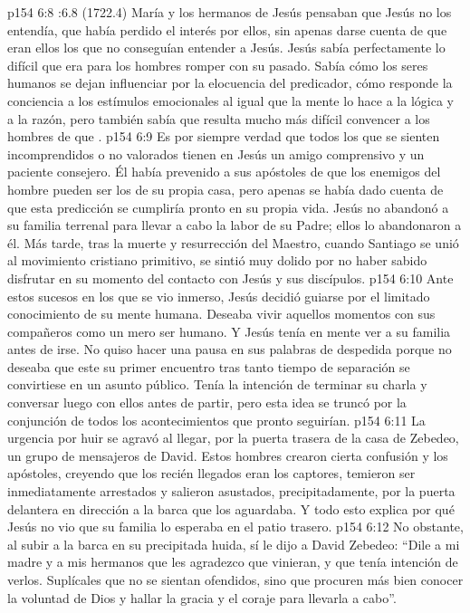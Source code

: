 \vs p154 6:8 :6.8 (1722.4) María y los hermanos de Jesús pensaban que Jesús no los entendía, que había perdido el interés por ellos, sin apenas darse cuenta de que eran ellos los que no conseguían entender a Jesús. Jesús sabía perfectamente lo difícil que era para los hombres romper con su pasado. Sabía cómo los seres humanos se dejan influenciar por la elocuencia del predicador, cómo responde la conciencia a los estímulos emocionales al igual que la mente lo hace a la lógica y a la razón, pero también sabía que resulta mucho más difícil convencer a los hombres de que .
\vs p154 6:9 Es por siempre verdad que todos los que se sienten incomprendidos o no valorados tienen en Jesús un amigo comprensivo y un paciente consejero. Él había prevenido a sus apóstoles de que los enemigos del hombre pueden ser los de su propia casa, pero apenas se había dado cuenta de que esta predicción se cumpliría pronto en su propia vida. Jesús no abandonó a su familia terrenal para llevar a cabo la labor de su Padre; ellos lo abandonaron a él. Más tarde, tras la muerte y resurrección del Maestro, cuando Santiago se unió al movimiento cristiano primitivo, se sintió muy dolido por no haber sabido disfrutar en su momento del contacto con Jesús y sus discípulos.
\vs p154 6:10 \pc Ante estos sucesos en los que se vio inmerso, Jesús decidió guiarse por el limitado conocimiento de su mente humana. Deseaba vivir aquellos momentos con sus compañeros como un mero ser humano. Y Jesús tenía en mente ver a su familia antes de irse. No quiso hacer una pausa en sus palabras de despedida porque no deseaba que este su primer encuentro tras tanto tiempo de separación se convirtiese en un asunto público. Tenía la intención de terminar su charla y conversar luego con ellos antes de partir, pero esta idea se truncó por la conjunción de todos los acontecimientos que pronto seguirían.
\vs p154 6:11 La urgencia por huir se agravó al llegar, por la puerta trasera de la casa de Zebedeo, un grupo de mensajeros de David. Estos hombres crearon cierta confusión y los apóstoles, creyendo que los recién llegados eran los captores, temieron ser inmediatamente arrestados y salieron asustados, precipitadamente, por la puerta delantera en dirección a la barca que los aguardaba. Y todo esto explica por qué Jesús no vio que su familia lo esperaba en el patio trasero.
\vs p154 6:12 No obstante, al subir a la barca en su precipitada huida, sí le dijo a David Zebedeo: “Dile a mi madre y a mis hermanos que les agradezco que vinieran, y que tenía intención de verlos. Suplícales que no se sientan ofendidos, sino que procuren más bien conocer la voluntad de Dios y hallar la gracia y el coraje para llevarla a cabo”.

